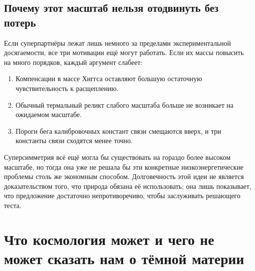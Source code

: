 \begin{classroomqa}
\end{classroomqa}

\subsection{Почему этот масштаб нельзя отодвинуть без потерь}

Если суперпартнёры лежат лишь немного за пределами экспериментальной досягаемости, все три мотивации ещё могут работать. Если их массы повысить на много порядков, каждый аргумент слабеет:
\begin{enumerate}
\item Компенсации в массе Хиггса оставляют большую остаточную чувствительность к расщеплению.
\item Обычный термальный реликт слабого масштаба больше не возникает на ожидаемом масштабе.
\item Пороги бега калибровочных констант связи смещаются вверх, и три константы связи сходятся менее точно.
\end{enumerate}
Суперсимметрия всё ещё могла бы существовать на гораздо более высоком масштабе, но тогда она уже не решала бы эти конкретные низкоэнергетические проблемы столь же экономным способом. Долговечность этой идеи не является доказательством того, что природа обязана её использовать; она лишь показывает, что предложение достаточно непротиворечиво, чтобы заслуживать решающего теста.

\section{Что космология может и чего не может сказать нам о тёмной материи}

\begin{classroomqa}
\end{classroomqa}

